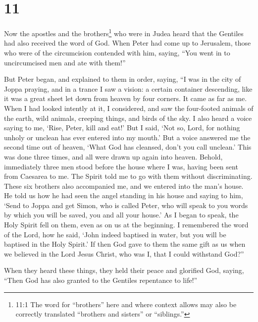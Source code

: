 \hypertarget{section-10}{%
\section{11}\label{section-10}}

 Now the apostles and the brothers\footnote{11:1 The word
  for ``brothers'' here and where context allows may also be correctly
  translated ``brothers and sisters'' or ``siblings.''} who were in
Judea heard that the Gentiles had also received the word of God.
 When Peter had come up to Jerusalem, those who were of the
circumcision contended with him,  saying, ``You went in to
uncircumcised men and ate with them!''

 But Peter began, and explained to them in order, saying,
 ``I was in the city of Joppa praying, and in a trance I saw
a vision: a certain container descending, like it was a great sheet let
down from heaven by four corners. It came as far as me. 
When I had looked intently at it, I considered, and saw the four-footed
animals of the earth, wild animals, creeping things, and birds of the
sky.  I also heard a voice saying to me, `Rise, Peter, kill
and eat!'  But I said, `Not so, Lord, for nothing unholy or
unclean has ever entered into my mouth.'  But a voice
answered me the second time out of heaven, `What God has cleansed, don't
you call unclean.'  This was done three times, and all were
drawn up again into heaven.  Behold, immediately three men
stood before the house where I was, having been sent from Caesarea to
me.  The Spirit told me to go with them without
discriminating. These six brothers also accompanied me, and we entered
into the man's house.  He told us how he had seen the angel
standing in his house and saying to him, `Send to Joppa and get Simon,
who is called Peter,  who will speak to you words by which
you will be saved, you and all your house.'  As I began to
speak, the Holy Spirit fell on them, even as on us at the beginning.
 I remembered the word of the Lord, how he said, `John
indeed baptised in water, but you will be baptised in the Holy Spirit.'
 If then God gave to them the same gift as us when we
believed in the Lord Jesus Christ, who was I, that I could withstand
God?''

 When they heard these things, they held their peace and
glorified God, saying, ``Then God has also granted to the Gentiles
repentance to life!''

